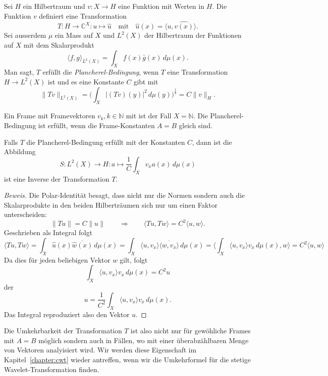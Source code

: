 \begin{definition}
Sei $H$ ein Hilbertraum und
$v\colon X\to H$ eine Funktion mit Werten in $H$.
Die Funktion $v$ definiert eine Transformation
\[
T\colon  H \to \mathbb C^X : u \mapsto \hat{u}
\quad\text{mit}\quad
\hat{u}(x) = \langle u,\hat{v(x)}\rangle.
\]
Sei ausserdem $\mu$ ein Mass auf $X$ und $L^2(X)$ der Hilbertraum
der Funktionen auf $X$ mit dem Skalarprodukt
\[
\langle f,g\rangle_{L^2(X)} = \int_X f(x) \bar{g}(x)\,d\mu(x).
\]
Man sagt, $T$ erfüllt die {\em Plancherel-Bedingung}, wenn $T$
eine Transformation $H\to L^2(X)$ ist und es eine Konstante $C$
gibt mit
\[
\| Tv \|_{L^2(X)}
=
\biggl(
\int_{X} |(Tv)(y)|^2 \, d\mu(y)
\biggr)^{\frac12}
=
C \|v\|_H.
\]
\end{definition}

Ein Frame mit Framevektoren $v_k, k\in\mathbb N$ mit
ist der Fall $X=\mathbb N$. Die Plancherel-Bedingung ist erfüllt, wenn
die Frame-Konstanten $A=B$ gleich sind.

\begin{satz}
\label{satz:plancherel-prinzip}
Falls $T$ die Plancherel-Bedingung erfüllt mit der Konstanten $C$, dann ist
die Abbildung
\[
S
\colon
L^2(X) \to H
:
a \mapsto \frac{1}{C}\int_X v_x a(x) \,d\mu(x)
\]
ist eine Inverse der Transformation $T$.
\end{satz}

\begin{proof}[Beweis]
Die Polar-Identität besagt, dass nicht nur die Normen sondern auch die
Skalarprodukte in den beiden Hilberträumen sich nur um einen Faktor
unterscheiden:
\[
\| Tu \| = C \| u \|
\qquad\Rightarrow\qquad
\langle Tu,Tw\rangle = C^2 \langle u,w\rangle.
\]
Geschrieben als Integral folgt
\[
\langle Tu,Tw\rangle
=
\int_X \hat{u}(x) \overline{\hat{w}(x)} \,d\mu(x)
=
\int_X \langle u,v_x\rangle \overline{\langle w,v_x\rangle}\,d\mu(x)
=
\biggl\langle
\int_X \langle u,v_x\rangle v_x\,d\mu(x),
w
\biggr\rangle
=
C^2
\langle u,w\rangle
\]
Da dies für jeden beliebigen Vektor $w$ gilt, folgt 
\[
\int_X \langle u,v_x\rangle v_x\,d\mu(x) = C^2 u
\]
der
\[
u = \frac{1}{C^2}\int_X \langle u,v_x\rangle v_x\,d\mu(x).
\]
Das Integral reproduziert also den Vektor $u$.
\end{proof}

Die Umkehrbarkeit der Transformation $T$ ist also nicht nur für gewöhliche
Frames mit $A=B$ möglich sondern auch in Fällen, wo mit einer überabzählbaren
Menge von Vektoren analyisiert wird.
Wir werden diese Eigenschaft im Kapitel~\ref{chapter:cwt} wieder antreffen,
wenn wir die Umkehrformel für die stetige Wavelet-Transformation finden.





